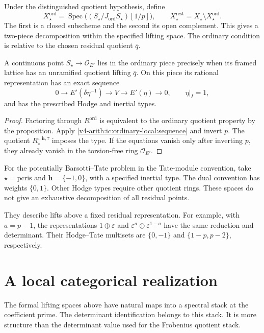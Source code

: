Under the distinguished quotient hypothesis, define
\[
 X_\star^{\mathrm{ord}}
 =\operatorname{Spec}\bigl((S_\star/J_{\mathrm{ord}}S_\star)[1/p]\bigr),
 \qquad
 X_\star^{\mathrm{rest}}=X_\star\setminus X_\star^{\mathrm{ord}}.
\]
The first is a closed subscheme and the second its open complement.
This gives a two-piece decomposition within the specified lifting
space. The ordinary condition is relative to the chosen residual
quotient $\bar q$.

\begin{corollary}
\label{v4-arith:ic:ordinary-local:typed-ordinary}
A continuous point $S_\star\to\mathcal O_{E'}$ lies in the ordinary
piece precisely when its framed lattice has an unramified quotient
lifting $\bar q$. On this piece its rational representation has
an exact sequence
\[
 0\longrightarrow E'(\delta\eta^{-1})\longrightarrow V
 \longrightarrow E'(\eta)\longrightarrow0,
 \qquad \eta|_I=1,
\]
and has the prescribed Hodge and inertial types.
\end{corollary}

\begin{proof}
Factoring through $R^{\mathrm{ord}}$ is equivalent to the ordinary
quotient property by the proposition. Apply
\eqref{v4-arith:ic:ordinary-local:sequence} and invert $p$.
The quotient $R^{\square,\mathbf h,\tau}_\star$ imposes the type.
If the equations vanish only after inverting $p$, they already vanish
in the torsion-free ring $\mathcal O_{E'}$.
\end{proof}

For the potentially Barsotti--Tate problem in the Tate-module
convention, take $\star=\mathrm{pcris}$ and
$\mathbf h=\{-1,0\}$, with a specified inertial type.
The dual convention has weights $\{0,1\}$.
Other Hodge types require other quotient rings.
These spaces do not give an exhaustive decomposition of all residual
points.

They describe lifts above a fixed residual representation.
For example, with $a=p-1$, the representations
$1\oplus\varepsilon$ and
$\varepsilon^a\oplus\varepsilon^{1-a}$ have the same reduction and
determinant. Their Hodge--Tate multisets are $\{0,-1\}$ and
$\{1-p,p-2\}$, respectively.


\section{A local categorical realization}
\label{v4-arith:ic:deg}

The formal lifting spaces above have natural maps into a spectral
stack at the coefficient prime. The determinant identification
belongs to this stack. It is more structure than the determinant
value used for the Frobenius quotient stack.



